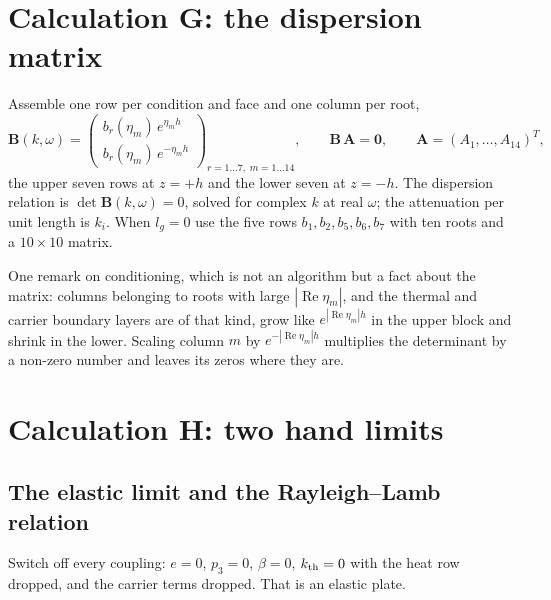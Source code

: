 \documentclass[11pt]{article}
\begin{document}
\section{Calculation G: the dispersion matrix}\label{sec:calcG}

Assemble one row per condition and face and one column per root,
\begin{equation}
\mathbf B(k,\omega)=
\begin{pmatrix}
b_r(\eta_m)\,e^{\eta_mh}\\
b_r(\eta_m)\,e^{-\eta_mh}
\end{pmatrix}_{r=1\dots7,\;m=1\dots14},
\qquad \mathbf B\,\mathbf A=\mathbf 0,
\qquad \mathbf A=(A_1,\dots,A_{14})^{T},
\label{eq:Bmat}
\end{equation}
the upper seven rows at $z=+h$ and the lower seven at $z=-h$. The dispersion relation is
$\det\mathbf B(k,\omega)=0$, solved for complex $k$ at real $\omega$; the attenuation per unit length is
$k_i$. When $l_g=0$ use the five rows $b_1,b_2,b_5,b_6,b_7$ with ten roots and a $10\times10$ matrix.

One remark on conditioning, which is not an algorithm but a fact about the matrix: columns belonging to
roots with large $|\operatorname{Re}\eta_m|$, and the thermal and carrier boundary layers are of that kind,
grow like $e^{|\operatorname{Re}\eta_m|h}$ in the upper block and shrink in the lower. Scaling column $m$
by $e^{-|\operatorname{Re}\eta_m|h}$ multiplies the determinant by a non-zero number and leaves its zeros
where they are.

\section{Calculation H: two hand limits}\label{sec:calcH}

\subsection*{The elastic limit and the Rayleigh--Lamb relation}

Switch off every coupling: $e=0$, $p_3=0$, $\beta=0$, $k_{\rm th}=0$ with the heat row dropped, and the
carrier terms dropped. That is an elastic plate.
\end{document}
